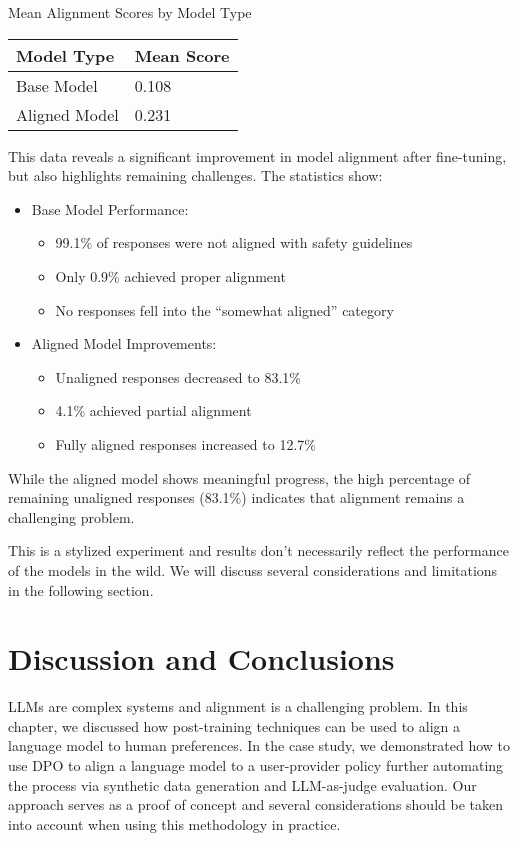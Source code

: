 \begin{margintable}
\caption{Mean Alignment Scores by Model Type}
\begin{tabular}{ll}
\toprule
Model Type & Mean Score \\
\midrule
Base Model & 0.108 \\
Aligned Model & 0.231 \\
\bottomrule
\end{tabular}
\end{margintable}

This data reveals a significant improvement in model alignment after fine-tuning, but also highlights remaining challenges. The statistics show:
\begin{itemize}
\item Base Model Performance:
  \begin{itemize}
  \item 99.1\% of responses were not aligned with safety guidelines
  \item Only 0.9\% achieved proper alignment
  \item No responses fell into the ``somewhat aligned'' category
  \end{itemize}
\item Aligned Model Improvements:
  \begin{itemize}
  \item Unaligned responses decreased to 83.1\%
  \item 4.1\% achieved partial alignment
  \item Fully aligned responses increased to 12.7\%
  \end{itemize}
\end{itemize}

While the aligned model shows meaningful progress, the high percentage of remaining unaligned responses (83.1\%) indicates that alignment remains a challenging problem.

This is a stylized experiment and results don't necessarily reflect the performance of the models in the wild. We will discuss several considerations and limitations in the following section.

\section{Discussion and Conclusions}

LLMs are complex systems and alignment is a challenging problem. In this chapter, we discussed how post-training techniques can be used to align a language model to human preferences. In the case study, we demonstrated how to use DPO to align a language model to a user-provider policy further automating the process via synthetic data generation and LLM-as-judge evaluation. Our approach serves as a proof of concept and several considerations should be taken into account when using this methodology in practice.


